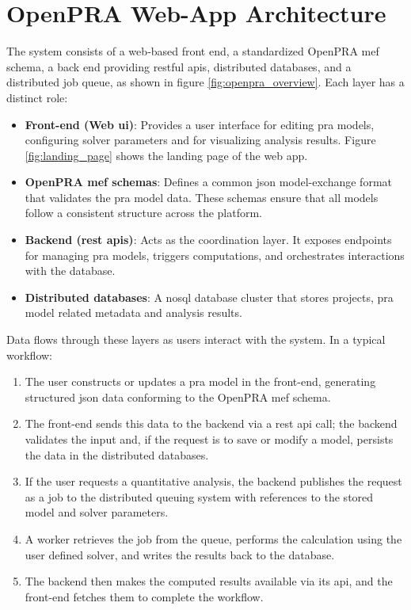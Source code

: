 \section{OpenPRA Web-App Architecture}
The system consists of a web‑based front end, a standardized OpenPRA \acrfull{mef} schema, a back end providing \acrfull{rest}ful \acrfull{api}s, distributed databases, and a distributed job queue, as shown in figure \ref{fig:openpra_overview}. Each layer has a distinct role:



\begin{itemize}
\item \textbf{Front-end (Web \acrshort{ui})}: Provides a user interface for editing \acrshort{pra} models, configuring solver parameters and for visualizing analysis results. Figure \ref{fig:landing_page} shows the landing page of the web app.
\item \textbf{OpenPRA \acrshort{mef} schemas}: Defines a common \acrshort{json} model-exchange format that validates the \acrshort{pra} model data. These schemas ensure that all models follow a consistent structure across the platform.
\item \textbf{Backend (\acrshort{rest} \acrfull{api}s)}: Acts as the coordination layer. It exposes endpoints for managing \acrshort{pra} models, triggers computations, and orchestrates interactions with the database.
\item \textbf{Distributed databases}: A \acrfull{nosql} database cluster that stores projects, \acrshort{pra} model related metadata and analysis results.
\end{itemize}

Data flows through these layers as users interact with the system. In a typical workflow:
\begin{enumerate}
\item The user constructs or updates a \acrshort{pra} model in the front-end, generating structured \acrshort{json} data conforming to the OpenPRA \acrshort{mef} schema.
\item The front-end sends this data to the backend via a \acrshort{rest} \acrshort{api} call; the backend validates the input and, if the request is to save or modify a model, persists the data in the distributed databases.
\item If the user requests a quantitative analysis, the backend publishes the request as a job to the distributed queuing system with references to the stored model and solver parameters.
\item A worker retrieves the job from the queue, performs the calculation using the user defined solver, and writes the results back to the database.
\item The backend then makes the computed results available via its \acrshort{api}, and the front-end fetches them to complete the workflow.
\end{enumerate}
